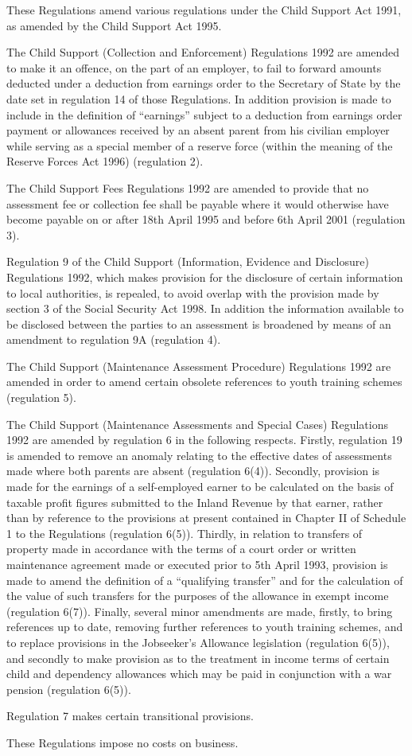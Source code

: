 \documentclass[12pt,a4paper]{article}
\begin{document}
These Regulations amend various regulations under the Child Support Act 1991, as amended by the Child Support Act 1995.

\begin{sloppypar}
  The Child Support (Collection and Enforcement) Regulations 1992 are amended to make it an offence, on the part of an employer, to fail to forward amounts deducted under a deduction from earnings order to the Secretary of State by the date set in regulation 14 of those Regulations. In addition provision is made to include in the definition of “earnings” subject to a deduction from earnings order payment or allowances received by an absent parent from his civilian employer while serving as a special member of a reserve force (within the meaning of the Reserve Forces Act 1996) (regulation 2).
\end{sloppypar}

  The Child Support Fees Regulations 1992 are amended to provide that no assessment fee or collection fee shall be payable where it would otherwise have become payable on or after 18th April 1995 and before 6th April 2001 (regulation 3).

  Regulation 9 of the Child Support (Information, Evidence and Disclosure) Regulations 1992, which makes provision for the disclosure of certain information to local authorities, is repealed, to avoid overlap with the provision made by section 3 of the Social Security Act 1998. In addition the information available to be disclosed between the parties to an assessment is broadened by means of an amendment to regulation 9A (regulation 4).

  The Child Support (Maintenance Assessment Procedure) Regulations 1992 are amended in order to amend certain obsolete references to youth training schemes (regulation 5).

  The Child Support (Maintenance Assessments and Special Cases) Regulations 1992 are amended by regulation 6 in the following respects. Firstly, regulation 19 is amended to remove an anomaly relating to the effective dates of assessments made where both parents are absent (regulation 6(4)). Secondly, provision is made for the earnings of a self-employed earner to be calculated on the basis of taxable profit figures submitted to the Inland Revenue by that earner, rather than by reference to the provisions at present contained in Chapter II of Schedule 1 to the Regulations (regulation 6(5)). Thirdly, in relation to transfers of property made in accordance with the terms of a court order or written maintenance agreement made or executed prior to 5th April 1993, provision is made to amend the definition of a “qualifying transfer” and for the calculation of the value of such transfers for the purposes of the allowance in exempt income (regulation 6(7)). Finally, several minor amendments are made, firstly, to bring references up to date, removing further references to youth training schemes, and to replace provisions in the Jobseeker’s Allowance legislation (regulation 6(5)), and secondly to make provision as to the treatment in income terms of certain child and dependency allowances which may be paid in conjunction with a war pension (regulation 6(5)).

  Regulation 7 makes certain transitional provisions.

  These Regulations impose no costs on business.
\end{document}
